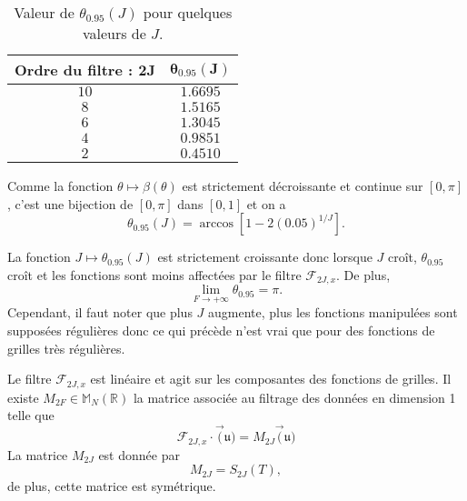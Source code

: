 \begin{table}
\begin{center}
\begin{tabular}{|c||c|}
\hline
\textbf{Ordre du filtre : }$\mathbf{2J}$ & $\mathbf{\theta_{0.95}(J)}$\\
\hline
\hline
$10$&$1.6695$\\
$8$&$1.5165$\\
$6$&$1.3045$\\
$4$&$0.9851$\\
$2$&$0.4510$\\
\hline
\end{tabular}
\end{center}
\caption{Valeur de $\theta_{0.95}(J)$ pour quelques valeurs de $J$.}
\label{tab:filter_095}
\end{table}

Comme la fonction $\theta \mapsto \beta(\theta)$ est strictement décroissante et continue sur $[0,\pi]$, c'est une bijection de $[0,\pi]$ dans $[0,1]$ et on a 
\begin{equation}
\theta_{0.95}(J) = \arccos \left[ 1-2 (0.05)^{1/J} \right].
\end{equation}


La fonction $J \mapsto \theta_{0.95}(J)$ est strictement croissante donc lorsque $J$ croît, $\theta_{0.95}$ croît et les fonctions sont moins affectées par le filtre $\mathcal{F}_{2J,x}$. De plus, 
\begin{equation}
\lim_{F \rightarrow +\infty} \theta_{0.95} = \pi.
\end{equation}
Cependant, il faut noter que plus $J$ augmente, plus les fonctions manipulées sont supposées régulières donc ce qui précède n'est vrai que pour des fonctions de grilles très régulières.

\begin{remarque}
Le filtre $\mathcal{F}_{2J,x}$ est linéaire et agit sur les composantes des fonctions de grilles. Il existe $M_{2F} \in \mathbb{M}_N \left( \mathbb{R} \right)$ la matrice associée au filtrage des données en dimension 1 telle que
\begin{equation}
\mathcal{F}_{2J,x} \cdot \vec(\mathfrak{u}) = M_{2J} \vec(\mathfrak{u})
\end{equation}
La matrice $M_{2J}$ est donnée par
\begin{equation}
M_{2J} = S_{2J}(T),
\label{eq:matrice_filtrage}
\end{equation}
de plus, cette matrice est symétrique.
\end{remarque}































